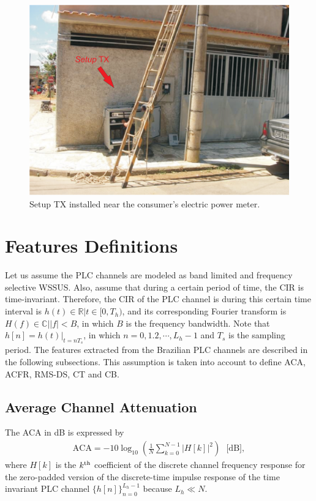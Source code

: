 \documentclass[journal]{IEEEtran}
\begin{document}
\begin{figure}[!htp]
	\begin{centering}		
	\includegraphics[scale=.4]{Figuras/setupTXnoconsumidor.eps}
	\caption{Setup TX installed near the consumer's electric power meter.}
		\label{Fig:setupRX}
	\end{centering}
\end{figure}

\section{Features Definitions}
\label{sec:parameters}

Let us assume the PLC channels are modeled as band limited and frequency selective \ac{WSSUS}. Also, assume that during a certain period of time, the \ac{CIR} is time-invariant. Therefore, the \ac{CIR} of the \ac{PLC} channel is during this certain time interval is  $ h(t)\in \mathbb{R}|t\in[0,T_h)$,  and its corresponding Fourier transform is $H(f)\in \mathbb{C}||f|<B$, in which $B$ is the frequency bandwidth. Note that $h[n]=h(t)|_{t=nT_s}$, in which $n=0,1.2,\cdots,L_h-1 $ and $T_s$ is the sampling period. The features extracted from the Brazilian PLC channels are described in the following subsections. This assumption is taken into account to define \ac{ACA}, \ac{ACFR}, \ac{RMS-DS}, \ac{CT} and \ac{CB}.

\subsection{Average Channel Attenuation}
The ACA in dB is expressed by
\begin{eqnarray}
	\textrm{ACA}=-10\log_{10}\left(\frac{1}{N}\sum_{k=0}^{N-1}|H[k]|^2\right) \ \ \ \mbox{[dB]},
\end{eqnarray}
where $H[k]$ is the $k^{\rm th}$ coefficient of the discrete channel frequency response for the zero-padded version of the discrete-time impulse response of the time invariant PLC channel $\{h[n]\}_{n=0}^{L_h-1}$ because $L_h \ll N$.
\end{document}
